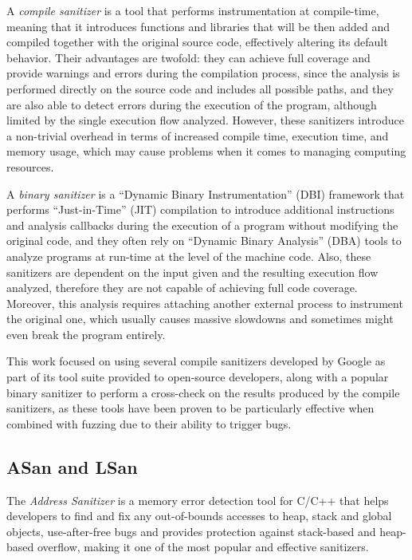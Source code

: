 A \textit{compile sanitizer} is a tool that performs instrumentation at compile-time, meaning that it introduces functions and libraries that will be then added and compiled together with the original source code, effectively altering its default behavior. Their advantages are twofold: they can achieve full coverage and provide warnings and errors during the compilation process, since the analysis is performed directly on the source code and includes all possible paths, and they are also able to detect errors during the execution of the program, although limited by the single execution flow analyzed. However, these sanitizers introduce a non-trivial overhead in terms of increased compile time, execution time, and memory usage, which may cause problems when it comes to managing computing resources.

A \textit{binary sanitizer} is a ``Dynamic Binary Instrumentation'' (DBI) framework that performs ``Just-in-Time'' (JIT) compilation to introduce additional instructions and analysis callbacks during the execution of a program without modifying the original code, and they often rely on ``Dynamic Binary Analysis'' (DBA) tools to analyze programs at run-time at the level of the machine code. Also, these sanitizers are dependent on the input given and the resulting execution flow analyzed, therefore they are not capable of achieving full code coverage. Moreover, this analysis requires attaching another external process to instrument the original one, which usually causes massive slowdowns and sometimes might even break the program entirely.

This work focused on using several compile sanitizers developed by Google \cite{san_repo} as part of its tool suite provided to open-source developers, along with a popular binary sanitizer \cite{valgrind_web} to perform a cross-check on the results produced by the compile sanitizers, as these tools have been proven to be particularly effective when combined with fuzzing due to their ability to trigger bugs.




\newpage
\subsection{ASan and LSan}
The \textit{Address Sanitizer} \cite{serebryany2012addresssanitizer} is a memory error detection tool for C/C++ that helps developers to find and fix any out-of-bounds accesses to heap, stack and global objects, use-after-free bugs and provides protection against stack-based and heap-based overflow, making it one of the most popular and effective sanitizers.


